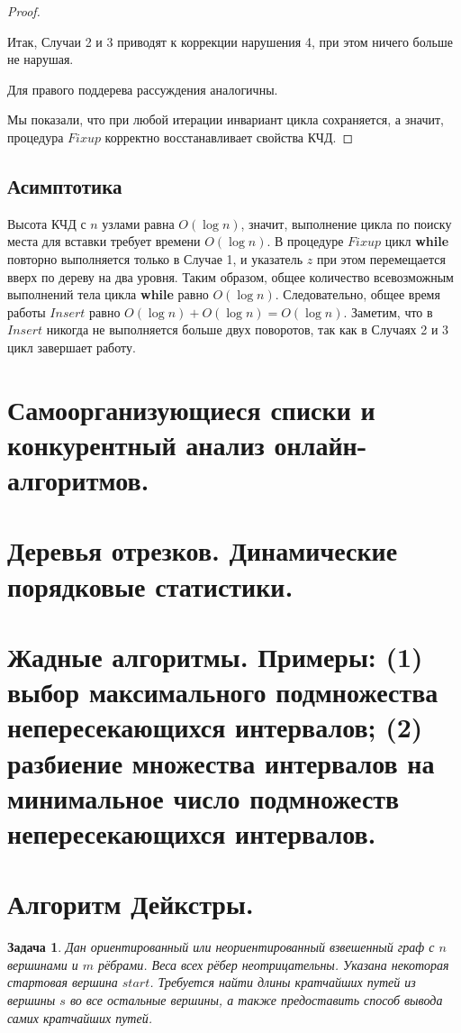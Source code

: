\documentclass[a4paper,12pt]{article}
\newtheorem*{on1n}{Задача}
\begin{document}
\begin{proof}
\begin{itemize}
\begin{enumerate}
            Итак, Случаи 2 и 3 приводят к коррекции нарушения 4, при этом ничего больше не нарушая.
        \end{enumerate}
    \end{itemize}
    
    Для правого поддерева рассуждения аналогичны.
    
    Мы показали, что при любой итерации инвариант цикла сохраняется, а значит, процедура $Fixup$ корректно восстанавливает свойства КЧД.
\end{proof}

\subsection{Асимптотика}

Высота КЧД с $n$ узлами равна $O(\log n)$, значит, выполнение цикла по поиску места для вставки требует времени $O(\log n)$. В процедуре $Fixup$ цикл \textbf{while} повторно выполняется только в Случае 1, и указатель $z$ при этом перемещается вверх по дереву на два уровня. Таким образом, общее количество всевозможным выполнений тела цикла \textbf{while} равно $O(\log n)$. Следовательно, общее время работы $Insert$ равно $O(\log n) + O(\log n) = O(\log n)$. Заметим, что в $Insert$ никогда не выполняется больше двух поворотов, так как в Случаях 2 и 3 цикл завершает работу.
\newpage
\section{Самоорганизующиеся списки и конкурентный анализ онлайн-алгоритмов.}
\newpage
\section{Деревья отрезков. Динамические порядковые статистики.}
\newpage
\section{Жадные алгоритмы. Примеры: (1) выбор максимального подмножества непересекающихся интервалов; (2) разбиение множества интервалов на минимальное число подмножеств непересекающихся интервалов.}
\newpage
\section{Алгоритм Дейкстры.}

\begin{on1n}
Дан ориентированный или неориентированный взвешенный граф с $n$ вершинами и $m$ рёбрами. Веса всех рёбер неотрицательны. Указана некоторая стартовая вершина $start$. Требуется найти длины кратчайших путей из вершины $s$ во все остальные вершины, а также предоставить способ вывода самих кратчайших путей.
\end{on1n}
\end{document}
